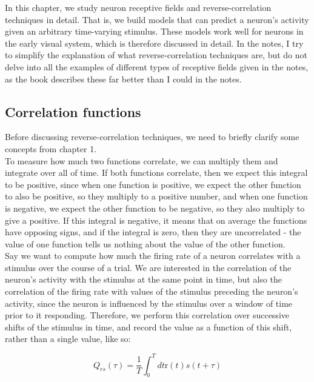 \documentclass{article}
\begin{document}
In this chapter, we study neuron receptive fields and reverse-correlation techniques in detail. That is, we build models that can predict a neuron's activity given an arbitrary time-varying stimulus. These models work well for neurons in the early visual system, which is therefore discussed in detail. In the notes, I try to simplify the explanation of what reverse-correlation techniques are, but do not delve into all the examples of different types of receptive fields given in the notes, as the book describes these far better than I could in the notes.

\subsection{Correlation functions}

Before discussing reverse-correlation techniques, we need to briefly clarify some concepts from chapter 1.\\

To measure how much two functions correlate, we can multiply them and integrate over all of time. If both functions correlate, then we expect this integral to be positive, since when one function is positive, we expect the other function to also be positive, so they multiply to a positive number, and when one function is negative, we expect the other function to be negative, so they also multiply to give a positive. If this integral is negative, it means that on average the functions have opposing signs, and if the integral is zero, then they are uncorrelated - the value of one function tells us nothing about the value of the other function.\\

Say we want to compute how much the firing rate of a neuron correlates with a stimulus over the course of a trial. We are interested in the correlation of the neuron's activity with the stimulus at the same point in time, but also the correlation of the firing rate with values of the stimulus preceding the neuron's activity, since the neuron is influenced by the stimulus over a window of time prior to it responding. Therefore, we perform this correlation over successive shifts of the stimulus in time, and record the value as a function of this shift, rather than a single value, like so:

\begin{equation*}
    Q_{rs}(\tau) = \frac{1}{T} \int_0^Tdt \text{r}(t)s(t+\tau)
\end{equation*}
\end{document}
